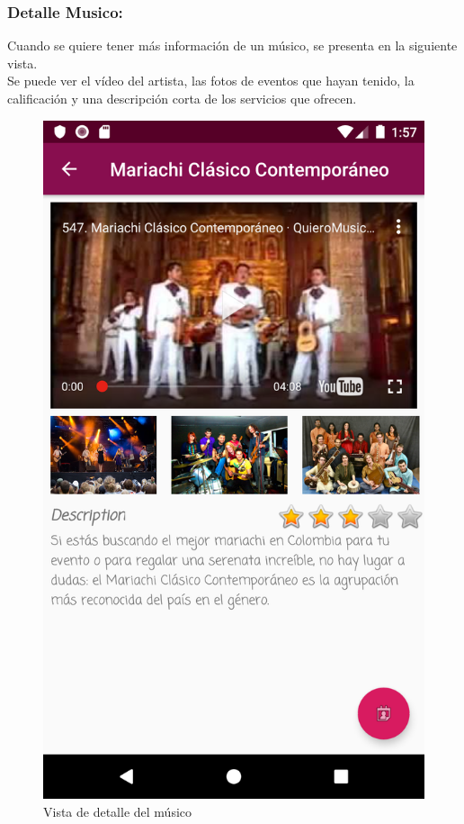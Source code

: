 \subsubsection{Detalle Musico:}
Cuando se quiere tener más información de un  músico, se presenta en la siguiente vista. \\
Se puede ver el vídeo del artista, las fotos de eventos que hayan tenido, la calificación y una descripción corta de los servicios que ofrecen. 
\begin{figure}[hbt!]
 \centering
\includegraphics[width=0.6\linewidth]{Desarrollo/Interfaces/Interfaces/imgs/detail.png}
\caption{Vista de detalle del músico}
\end{figure}
\newpage

